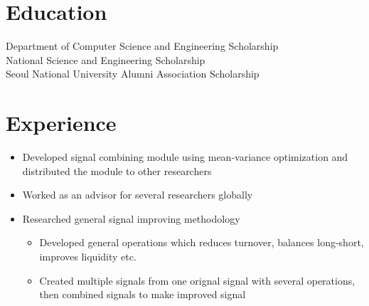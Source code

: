 \documentclass[11pt,a4paper,sans]{moderncv}        %
\begin{document}
\makecvtitle%
\vspace*{-10mm}

\section{Education}
{Department of Computer Science and Engineering Scholarship\\
National Science and Engineering Scholarship\\
Seoul National University Alumni Association Scholarship}

\section{Experience}
{\begin{itemize}%
    \item Developed signal combining module using mean-variance optimization and distributed the module to other researchers
    \item Worked as an advisor for several researchers globally
    \item Researched general signal improving methodology
        \begin{itemize}%
            \item Developed general operations which reduces turnover, balances long-short, improves liquidity etc.
            \item Created multiple signals from one orignal signal with several operations, then combined signals to make improved signal
        \end{itemize}
\end{itemize}}
\end{document}
